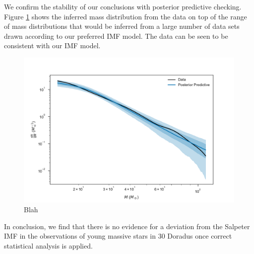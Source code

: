 \documentclass[apjl]{emulateapj}
\begin{document}
We confirm the stability of our conclusions with posterior predictive checking.  Figure \ref{fig:PPC} shows the inferred mass distribution from the data on top of the range of mass distributions that would be inferred from a large number of data sets drawn according to our preferred IMF model.  The data can be seen to be consistent with our IMF model.

\begin{figure}
    		    		\includegraphics[trim={0cm 0cm 0cm 0cm},clip,scale=0.4]{dNdm-ppc-band.pdf}
    		\caption{Blah}\label{fig:PPC}
\end{figure}


In conclusion, we find that there is no evidence for a deviation from the Salpeter IMF in the observations of young massive stars in 30 Doradus once correct statistical analysis is applied.



\end{document}
